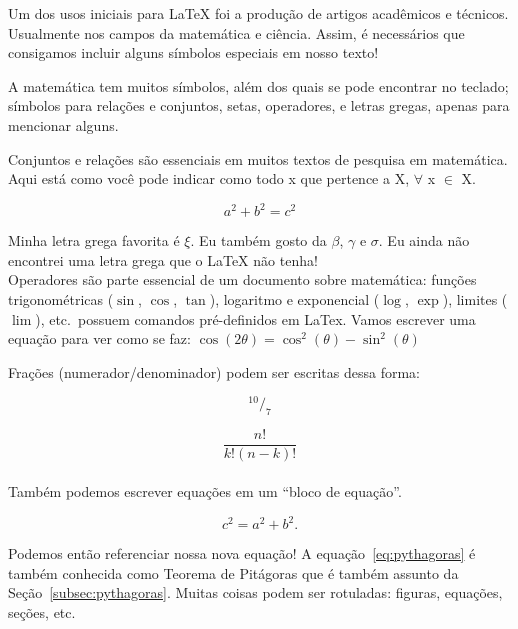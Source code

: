 \documentclass[12pt]{article}
\begin{document}
Um dos usos iniciais para \LaTeX{} foi a produção de artigos
acadêmicos e técnicos. Usualmente nos campos da matemática e ciência. Assim, é
necessários que consigamos incluir alguns símbolos especiais em nosso texto!

A matemática tem muitos símbolos, além dos quais se pode encontrar no teclado;
símbolos para relações e conjuntos, setas, operadores, e letras gregas, apenas
para mencionar alguns.

Conjuntos e relações são essenciais em muitos textos de pesquisa em matemática.
Aqui está como você pode indicar como todo x que pertence
a X, $\forall$ x $\in$ X.

\[a^2 + b^2 = c^2 \]

Minha letra grega favorita é $\xi$. Eu também gosto da $\beta$, $\gamma$ e $\sigma$.
Eu ainda não encontrei uma letra grega que o \LaTeX{} não tenha!\\

Operadores são parte essencial de um documento sobre matemática:
funções trigonométricas ($\sin$, $\cos$, $\tan$),
logaritmo e exponencial ($\log$, $\exp$), 
limites ($\lim$), etc.~possuem comandos pré-definidos em LaTex. 
Vamos escrever uma equação para ver como se faz:
$\cos(2\theta) = \cos^{2}(\theta) - \sin^{2}(\theta)$

Frações (numerador/denominador) podem ser escritas dessa forma:

$$ ^{10}/_{7} $$

$$ \frac{n!}{k!(n - k)!} $$ \\

Também podemos escrever equações em um ``bloco de equação''.

\begin{equation} %
    c^2 = a^2 + b^2.
    \label{eq:pythagoras} %
    \end{equation} %

Podemos então referenciar nossa nova equação!
A equação~\ref{eq:pythagoras} é também conhecida como Teorema de Pitágoras que é
também assunto da Seção~\ref{subsec:pythagoras}. Muitas coisas podem ser
rotuladas: figuras, equações, seções, etc.
\end{document}
